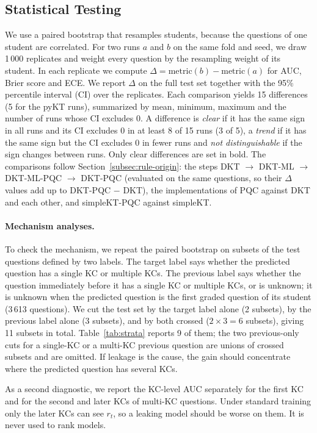 \subsection{Statistical Testing}
\label{subsec:boot}
We use a paired bootstrap that resamples students, because the questions of one student are correlated.
For two runs $a$ and $b$ on the same fold and seed, we draw 1\,000 replicates and weight every question by the resampling weight of its student.
In each replicate we compute $\Delta=\mathrm{metric}(b)-\mathrm{metric}(a)$ for AUC, Brier score and ECE.
We report $\Delta$ on the full test set together with the 95\% percentile interval (CI) over the replicates. 
Each comparison yields 15 differences (5 for the pyKT runs), summarized by mean, minimum, maximum and the number of runs whose CI excludes 0. 
A difference is \emph{clear} if it has the same sign in all runs and its CI excludes 0 in at least 8 of 15 runs (3 of 5), a \emph{trend} if it has the same sign but the CI excludes 0 in fewer runs and \emph{not distinguishable} if the sign changes between runs. 
Only clear differences are set in bold. 
The comparisons follow Section~\ref{subsec:rule-origin}: the steps DKT $\to$ DKT-ML $\to$ DKT-ML-PQC $\to$ DKT-PQC (evaluated on the same questions, so their $\Delta$ values add up to DKT-PQC $-$ DKT), the implementations of PQC against DKT and each other, and simpleKT-PQC against simpleKT.
 
\paragraph{Mechanism analyses.}
To check the mechanism, we repeat the paired bootstrap on subsets of the test questions defined by two labels. The target label says whether the predicted question has a single KC or multiple KCs. The previous label says whether the question immediately before it has a single KC or multiple KCs, or is unknown; it is unknown when the predicted question is the first graded question of its student (3\,613 questions).
We cut the test set by the target label alone (2 subsets), by the previous label alone (3 subsets), and by both crossed ($2\times 3=6$ subsets), giving 11 subsets in total. Table~\ref{tab:strata} reports 9 of them; the two previous-only cuts for a single-KC or a multi-KC previous question are unions of crossed subsets and are omitted.
If leakage is the cause, the gain should concentrate where the predicted question has several KCs.

As a second diagnostic, we report the KC-level AUC separately for the first KC and for the second and later KCs of multi-KC questions. Under standard training only the later KCs can see $r_t$, so a leaking model should be worse on them. It is never used to rank models. 
 
